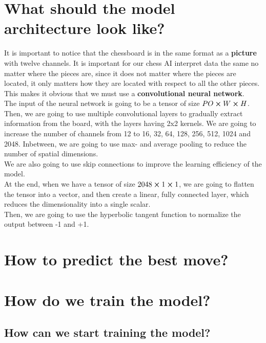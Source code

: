 \documentclass[12pt]{article}
\begin{document}
\newpage

\section{What should the model architecture look like?}
It is important to notice that the chessboard is in the same format as a \textbf{picture} with twelve channels. It is important for our chess AI interpret data the same no matter where the pieces are, since it does not matter where the pieces are located, it only matters how they are located with respect to all the other pieces. This makes it obvious that we must use a \textbf{convolutional neural network}. \\
The input of the neural network is going to be a tensor of size \(PO \cross W \cross H\). \\
Then, we are going to use multiple convolutional layers to gradually extract information from the board, with the layers having 2x2 kernels. We are going to increase the number of channels from 12 to 16, 32, 64, 128, 256, 512, 1024 and 2048. Inbetween, we are going to use max- and average pooling to reduce the number of spatial dimensions. \\
We are also going to use skip connections to improve the learning efficiency of the model.  \\
At the end, when we have a tensor of size \(2048 \cross 1 \cross 1\), we are going to flatten the tensor into a vector, and then create a linear, fully connected layer, which reduces the dimensionality into a single scalar. \\
Then, we are going to use the hyperbolic tangent function to normalize the output between -1 and +1.

\newpage

\section{How to predict the best move?}

\newpage

\section{How do we train the model?}

\subsection{How can we start training the model?}
\end{document}
